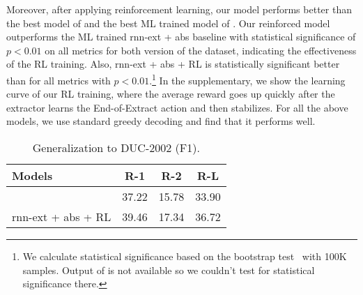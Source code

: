 \documentclass[11pt,a4paper]{article}
\begin{document}
Moreover, after applying reinforcement learning, our model performs better than the best model of \citet{get_to_the_point} and the best ML trained model of \citet{DBLP:journals/corr/PaulusXS17}.
Our reinforced model outperforms the ML trained rnn-ext + abs baseline with statistical significance of $p < 0.01$ on all metrics for both version of the dataset, indicating the effectiveness of the RL training.
Also, rnn-ext + abs + RL is statistically significant better than \citet{get_to_the_point} for all metrics with $p < 0.01$.\footnote{We calculate statistical significance based on the bootstrap test~\cite{noreen1989computer,efron1994introduction} with 100K samples. Output of \citet{DBLP:journals/corr/PaulusXS17} is not available so we couldn't test for statistical significance there.}
In the supplementary, we show the learning curve of our RL training, where the average reward goes up quickly after the extractor learns the End-of-Extract action and then stabilizes.
For all the above models, we use standard greedy decoding and find that it performs well.


\begin{table}[t]
\begin{small}
\centering
\begin{tabular}{ | l | c  c  c |}
  \hline
  Models & R-1 & R-2 & R-L \\
  \hline
  \citet{get_to_the_point} & 37.22 & 15.78 & 33.90 \\
  rnn-ext + abs + RL  & 39.46 & 17.34 & 36.72 \\ \hline
\end{tabular}
\vspace{-8pt}
\caption{Generalization to DUC-2002 (F1). }
\vspace{-12pt}
\label{tab:duc}
\end{small}
\end{table}
\end{document}
